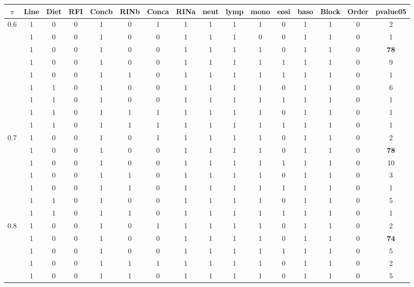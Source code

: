\documentclass[12pt, letter]{article}\usepackage[]{graphicx}\usepackage[]{color}
\begin{document}
\begin{table}
\centering
{\scriptsize
\begin{tabular}{|c|c|c|c|c|c|c|c|c|c|c|c|c|c|c|c|}
  \hline
$\pi$ & Line & Diet & RFI & Concb & RINb & Conca & RINa & neut & lymp & mono & eosi & baso & Block & Order & pvalue05 \\ 
  \hline
0.6 & 1 & 0 & 0 & 1 & 0 & 1 & 1 & 1 & 1 & 1 & 0 & 1 & 1 & 0 & 2 \\ 
   & 1 & 0 & 0 & 1 & 0 & 0 & 1 & 1 & 1 & 0 & 0 & 1 & 1 & 0 & 1 \\ 
   & 1 & 0 & 0 & 1 & 0 & 0 & 1 & 1 & 1 & 1 & 0 & 1 & 1 & 0 & \textbf{78} \\ 
   & 1 & 0 & 0 & 1 & 0 & 0 & 1 & 1 & 1 & 1 & 1 & 1 & 1 & 0 & 9 \\ 
   & 1 & 0 & 0 & 1 & 1 & 0 & 1 & 1 & 1 & 1 & 1 & 1 & 1 & 0 & 1 \\ 
   & 1 & 1 & 0 & 1 & 0 & 0 & 1 & 1 & 1 & 1 & 0 & 1 & 1 & 0 & 6 \\ 
   & 1 & 1 & 0 & 1 & 0 & 0 & 1 & 1 & 1 & 1 & 1 & 1 & 1 & 0 & 1 \\ 
   & 1 & 1 & 0 & 1 & 1 & 1 & 1 & 1 & 1 & 1 & 0 & 1 & 1 & 0 & 1 \\ 
   & 1 & 1 & 0 & 1 & 1 & 1 & 1 & 1 & 1 & 1 & 1 & 1 & 1 & 0 & 1 \\ 
   \hline
0.7 & 1 & 0 & 0 & 1 & 0 & 1 & 1 & 1 & 1 & 1 & 0 & 1 & 1 & 0 & 2 \\ 
   & 1 & 0 & 0 & 1 & 0 & 0 & 1 & 1 & 1 & 1 & 0 & 1 & 1 & 0 & \textbf{78} \\ 
   & 1 & 0 & 0 & 1 & 0 & 0 & 1 & 1 & 1 & 1 & 1 & 1 & 1 & 0 & 10 \\ 
   & 1 & 0 & 0 & 1 & 1 & 0 & 1 & 1 & 1 & 1 & 0 & 1 & 1 & 0 & 3 \\ 
   & 1 & 0 & 0 & 1 & 1 & 0 & 1 & 1 & 1 & 1 & 1 & 1 & 1 & 0 & 1 \\ 
   & 1 & 1 & 0 & 1 & 0 & 0 & 1 & 1 & 1 & 1 & 0 & 1 & 1 & 0 & 5 \\ 
   & 1 & 1 & 0 & 1 & 1 & 0 & 1 & 1 & 1 & 1 & 1 & 1 & 1 & 0 & 1 \\ 
   \hline
0.8 & 1 & 0 & 0 & 1 & 0 & 1 & 1 & 1 & 1 & 1 & 0 & 1 & 1 & 0 & 2 \\ 
   & 1 & 0 & 0 & 1 & 0 & 0 & 1 & 1 & 1 & 1 & 0 & 1 & 1 & 0 & \textbf{74} \\ 
   & 1 & 0 & 0 & 1 & 0 & 0 & 1 & 1 & 1 & 1 & 1 & 1 & 1 & 0 & 5 \\ 
   & 1 & 0 & 0 & 1 & 1 & 1 & 1 & 1 & 1 & 1 & 0 & 1 & 1 & 0 & 2 \\ 
   & 1 & 0 & 0 & 1 & 1 & 0 & 1 & 1 & 1 & 1 & 0 & 1 & 1 & 0 & 5 \\ 

\end{tabular}}
\end{table}
\end{document}

